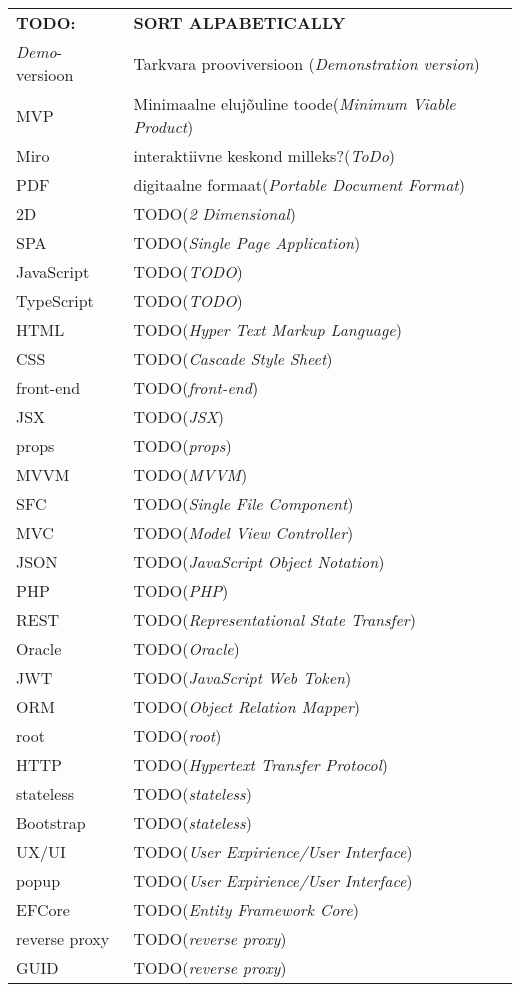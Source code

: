 \begin{longtable}{p{3cm}p{10cm}}
\textbf{TODO:}&\textbf{SORT ALPABETICALLY}\\
\textit{Demo}-versioon&Tarkvara prooviversioon (\emph{Demonstration version})\\
MVP&Minimaalne elujõuline toode(\emph{Minimum Viable Product})\\
Miro&interaktiivne keskond milleks?(\emph{ToDo})\\
PDF&digitaalne formaat(\emph{Portable Document Format})\\
2D&TODO(\emph{2 Dimensional})\\
SPA&TODO(\emph{Single Page Application})\\
JavaScript&TODO(\emph{TODO})\\
TypeScript&TODO(\emph{TODO})\\
HTML&TODO(\emph{Hyper Text Markup Language})\\
CSS&TODO(\emph{Cascade Style Sheet})\\
front-end&TODO(\emph{front-end})\\
JSX&TODO(\emph{JSX})\\
props&TODO(\emph{props})\\
MVVM&TODO(\emph{MVVM})\\
SFC&TODO(\emph{Single File Component})\\
MVC&TODO(\emph{Model View Controller})\\
JSON&TODO(\emph{JavaScript Object Notation})\\
PHP&TODO(\emph{PHP})\\
REST&TODO(\emph{Representational State Transfer})\\
Oracle&TODO(\emph{Oracle})\\
JWT&TODO(\emph{JavaScript Web Token})\\
ORM&TODO(\emph{Object Relation Mapper})\\
root&TODO(\emph{root})\\
HTTP&TODO(\emph{Hypertext Transfer Protocol})\\
stateless&TODO(\emph{stateless})\\
Bootstrap&TODO(\emph{stateless})\\
UX/UI&TODO(\emph{User Expirience/User Interface})\\
popup&TODO(\emph{User Expirience/User Interface})\\
EFCore&TODO(\emph{Entity Framework Core})\\
reverse proxy&TODO(\emph{reverse proxy})\\
GUID&TODO(\emph{reverse proxy})\\


\end{longtable}
\addtocounter{table}{-1} 